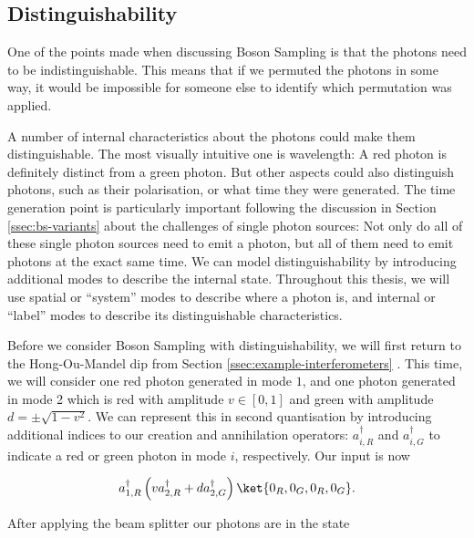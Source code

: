 \subsection{Distinguishability}
\label{ssec:imperfections-distinguishability}

One of the points made when discussing Boson Sampling is that the photons need to be indistinguishable. This means that if we permuted the photons in some way, it would be impossible for someone else to identify which permutation was applied.

A number of internal characteristics about the photons could make them distinguishable. The most visually intuitive one is wavelength: A red photon is definitely distinct from a green photon. But other aspects could also distinguish photons, such as their polarisation, or what time they were generated. The time generation point is particularly important following the discussion in Section \ref{ssec:bs-variants} about the challenges of single photon sources: Not only do all of these single photon sources need to emit a photon, but all of them need to emit photons at the exact same time. We can model distinguishability by introducing additional modes to describe the internal state. Throughout this thesis, we will use spatial or ``system'' modes to describe where a photon is, and internal or ``label'' modes to describe its distinguishable characteristics.

Before we consider Boson Sampling with distinguishability, we will first return to the Hong-Ou-Mandel dip from Section \ref{ssec:example-interferometers} \cite{hong1987}. This time, we will consider one red photon generated in mode $1$, and one photon generated in mode 2 which is red with amplitude $v\in [0,1]$ and green with amplitude $d=\pm\sqrt{1-v^2}$. We can represent this in second quantisation by introducing additional indices to our creation and annihilation operators: $a_{i,R}^\dagger$ and $a_{i,G}^\dagger$ to indicate a red or green photon in mode $i$, respectively. Our input is now

\begin{equation}
a_{1,R}^\dagger\left(v a_{2,R}^\dagger + da_{2,G}^\dagger\right)\ket{0_R,0_G,0_R,0_G}.
\end{equation}

After applying the beam splitter our photons are in the state

